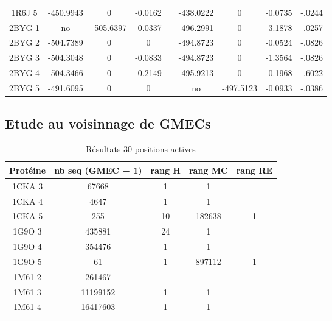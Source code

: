 \documentclass[a4paper,12pt]{article}
\begin{document}
\begin{table}[h]
\begin{tabular}{|c|c|c|c|c|c|c|c|c|}
        1R6J 5 & -450.9943 & 0 & -0.0162 & & -438.0222 & 0 & -0.0735 & -.0244 \\        
        2BYG 1 & no & -505.6397 & -0.0337 & & -496.2991 & 0 & -3.1878 & -.0257 \\        
        2BYG 2 & -504.7389 & 0 & 0 & & -494.8723 & 0 & -0.0524 & -.0826 \\        
        2BYG 3 & -504.3048 & 0 & -0.0833 & & -494.8723 & 0 & -1.3564 & -.0826 \\        
        2BYG 4 & -504.3466 & 0 & -0.2149 & & -495.9213 & 0 & -0.1968 & -.6022 \\        
        2BYG 5 & -491.6095 & 0 & 0 & & no & -497.5123 & -0.0933 & -.0386 \\       
    
    \hline


 \end{tabular}      
 \label{tab_echec_10_20}      
\end{table}





   \subsection{ Etude au voisinnage de GMECs}


    \begin{table}[h]
      \centering

      \begin{tabular}{|c|c|c|c|c|}

        Protéine & nb seq (GMEC + 1) & rang H &rang MC & rang RE \\
        \hline

        1CKA 3 &  67668 & 1 & 1 & \\
        1CKA 4 &  4647 & 1 & 1 & \\
        1CKA 5 &  255 &  10 & 182638 & 1 \\
        1G9O 3 &  435881 & 24 & 1 \\
        1G9O 4 &  354476 & 1 & 1 \\
        1G9O 5 &  61 & 1 & 897112 & 1 \\
        1M61 2 &  261467 &  & \\
        1M61 3 &  11199152 & 1 & 1 &\\
        1M61 4 &  16417603  & 1 & 1 & \\
        \hline


 \end{tabular}      
 \caption{Résultats 30 positions actives }
 \label{tab_echec2BYG__1}      
\end{table}
\end{document}
